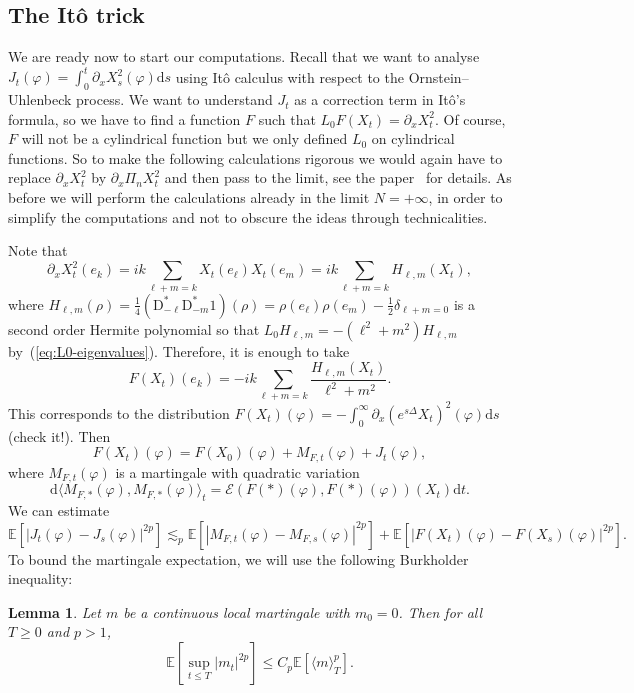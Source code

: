 \documentclass[a4paper,11pt]{article}
\newcommand{\mathD}{\mathrm{D}}
\newcommand{\mathd}{\mathrm{d}}
\newtheorem{lemma}{Lemma}
{\theorembodyfont{\rmfamily}\newtheorem{remark}{Remark}}
\begin{document}
\subsection{The It{\^o} trick}

We are ready now to start our computations. Recall that we want to analyse
$J_t (\varphi) = \int_0^t \partial_x X_s^2 (\varphi) \mathd s$ using It{\^o}
calculus with respect to the Ornstein--Uhlenbeck process. We want to
understand $J_t$ as a correction term in It{\^o}'s formula, so we have to find
a function $F$ such that $L_0 F (X_t) = \partial_x X_t^2$. Of course, $F$ will
not be a cylindrical function but we only defined $L_0$ on cylindrical
functions. So to make the following calculations rigorous we would again have
to replace $\partial_x X_t^2$ by $\partial_x \Pi_n X^2_t$ and then pass to the
limit, see the paper~{\cite{gubinelli_regularization_2013}} for details. As
before we will perform the calculations already in the limit $N = + \infty$,
in order to simplify the computations and not to obscure the ideas through
technicalities.

Note that
\[ \partial_x X_t^2 (e_k) = ik \sum_{\ell + m = k} X_t (e_{\ell}) X_t (e_m) =
   i k \sum_{\ell + m = k} H_{\ell, m} (X_t), \]
where $H_{\ell, m} (\rho) = \frac{1}{4} (\mathD^{\ast}_{- \ell}
\mathD^{\ast}_{- m} 1) (\rho) = \rho (e_{\ell}) \rho (e_m) - \frac{1}{2}
\delta_{\ell + m = 0}$ is a second order Hermite polynomial so that $L_0
H_{\ell, m} = - (\ell^2 + m^2) H_{\ell, m}$ by~(\ref{eq:L0-eigenvalues}).
Therefore, it is enough to take
\begin{equation}
  F (X_t) (e_k) = - ik \sum_{\ell + m = k} \frac{H_{\ell, m} (X_t)}{\ell^2 +
  m^2} .
\end{equation}
This corresponds to the distribution $F (X_t) (\varphi) = - \int_0^{\infty}
\partial_x (e^{s \Delta} X_t)^2 (\varphi) \mathd s$ (check it!). Then
\[ F (X_t) (\varphi) = F (X_0) (\varphi) + M_{F, t} (\varphi) + J_t (\varphi),
\]
where $M_{F, t} (\varphi)$ is a martingale with quadratic variation
\[ \mathd \langle M_{F, \ast} (\varphi), M_{F, \ast} (\varphi) \rangle_t
   =\mathcal{E} (F (\ast) (\varphi), F (\ast) (\varphi)) (X_t) \mathd t. \]
We can estimate
\[ \mathbb{E} [| J_t (\varphi) - J_s (\varphi) |^{2 p}] \lesssim_p
   \mathbb{E} [| M_{F, t} (\varphi) - M_{F, s} (\varphi) |^{2 p}]
   +\mathbb{E} [| F (X_t) (\varphi) - F (X_s) (\varphi) |^{2 p}] . \]
To bound the martingale expectation, we will use the following Burkholder
inequality:

\begin{lemma}
  Let $m$ be a continuous local martingale with $m_0 = 0$. Then for all $T
  \geqslant 0$ and $p > 1$,
  \[ \mathbb{E} [\sup_{t \leqslant T} | m_t |^{2 p}] \leqslant C_p
     \mathbb{E} [\langle m \rangle_T^p] . \]
\end{lemma}
\end{document}
